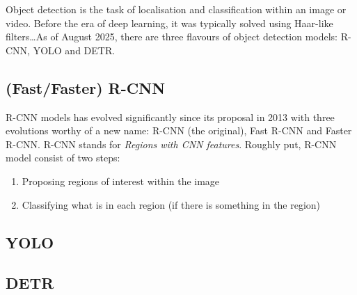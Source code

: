 \documentclass[11pt]{article}
\begin{document}
Object detection is the task of localisation and classification within an image or video. Before the era of deep learning, it was typically solved using Haar-like filters\dots As of August 2025, there are three flavours of object detection models: R-CNN, YOLO and DETR.

\subsection{\TODO{: }(Fast/Faster) R-CNN}
R-CNN models has evolved significantly since its proposal in 2013 with three evolutions worthy of a new name: R-CNN (the original), Fast R-CNN and Faster R-CNN. R-CNN stands for \textit{Regions with CNN features}. Roughly put, R-CNN model consist of two steps:
\begin{enumerate}
    \item Proposing regions of interest within the image
    \item Classifying what is in each region (if there is something in the region)
\end{enumerate}

\subsection{\TODO{: }YOLO}

\subsection{\TODO{: }DETR}




\end{document}
